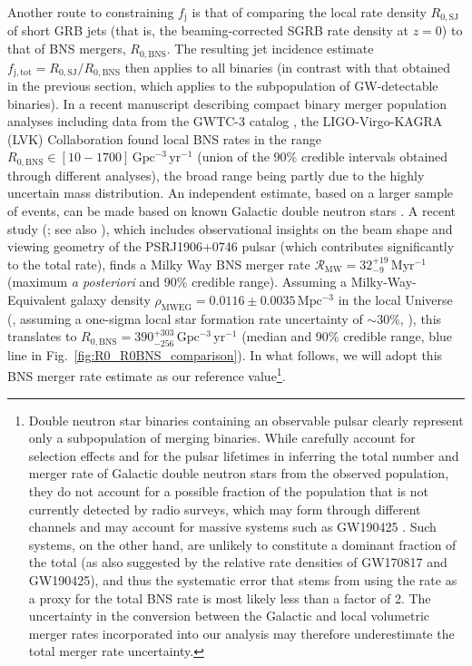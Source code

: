 \documentclass[]{aa}
\newcommand{\resp}[1]{#1}
\begin{document}
Another route to constraining $f_\mathrm{j}$ is that of comparing the local rate \resp{density} $R_\mathrm{0,SJ}$ of short GRB \resp{jets} \resp{(that is, the beaming-corrected SGRB rate density at $z=0$)} to that of BNS mergers, $R_\mathrm{0,BNS}$. \resp{The resulting jet incidence estimate} $f_\mathrm{j,tot}=R_\mathrm{0,SJ}/R_\mathrm{0,BNS}$ \resp{then} applies to all binaries (in contrast with that obtained in the previous section, which applies to the subpopulation of GW-detectable binaries). In a recent manuscript \citep{LVC2021_GWTC3pop} describing compact binary merger population analyses including data from the GWTC-3 catalog \citep{LVC2021_GWTC3}, the LIGO-Virgo-KAGRA (LVK) Collaboration found local BNS rates in the range $R_\mathrm{0,BNS}\in [10-1700]\,\mathrm{Gpc^{-3}\,yr^{-1}}$ (union of the 90\% credible intervals obtained through different analyses), the broad range being partly due to the highly uncertain mass distribution. An independent estimate, based on a larger sample of events, can be made based on known Galactic double neutron stars \citep{Kim2003}. A recent study (\citealt{Grunthal2021}; see also \citealt{Pol2020}), which includes observational insights on the beam shape and viewing geometry of the PSRJ1906+0746 pulsar (which contributes significantly to the total rate), finds a Milky Way BNS merger rate $\mathcal{R}_\mathrm{MW}=32_{-9}^{+19}\,\mathrm{Myr^{-1}}$ (\resp{maximum \textit{a posteriori} and 90\% credible range}). Assuming a Milky-Way-Equivalent galaxy density $\rho_\mathrm{MWEG}=0.0116\pm 0.0035\,\mathrm{Mpc^{-3}}$ in the local Universe (\citealt{Abadie2010,Kopparapu2008}, \resp{assuming a one-sigma local star formation rate uncertainty of $\sim 30\%$, \citealt{MadauFragos2017})}, this translates to $R_\mathrm{0,BNS}=390_{-256}^{+303}\,\mathrm{Gpc^{-3}\,yr^{-1}}$ (median and 90\% credible range, blue line in Fig.~\ref{fig:R0_R0BNS_comparison}). In what follows, we will adopt this BNS merger rate estimate as our reference \resp{value}\footnote{Double neutron star binaries containing an observable pulsar clearly represent only a subpopulation of merging binaries. While \citet{Grunthal2021} carefully account for selection effects and for the pulsar lifetimes in \resp{inferring the total number and merger rate of Galactic double neutron stars from the observed population}, they do not account for a possible fraction of the population that is not currently detected by radio surveys, which may form through different channels \citep[e.g.][]{VignaGomez2021} and may account for massive systems such as GW190425 \citep{Abbott2020_GW190425}. Such systems, on the other hand, are unlikely to constitute a dominant fraction of the total (as also suggested by the relative rate densities of GW170817 \resp{and} GW190425), and thus the systematic error that stems from using the \citet{Grunthal2021} rate as a proxy for the total BNS rate is most likely less than a factor of 2.  \resp{The uncertainty in the conversion between the Galactic and local volumetric merger rates incorporated into our analysis may therefore underestimate the total merger rate uncertainty.}}.  
\end{document}
